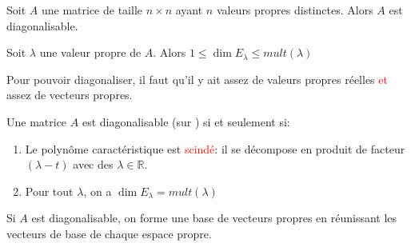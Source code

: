    \begin{theoreme}
        Soit $A$ une matrice de taille $n \times n$ ayant $n$ valeurs propres distinctes. Alors $A$ est diagonalisable.
    \end{theoreme}
    \begin{theoreme}
        Soit $\lambda$ une valeur propre de $A$. Alors $1 \leq \dim E_\lambda \leq mult(\lambda)$
    \end{theoreme}
    Pour pouvoir diagonaliser, il faut qu'il y ait assez de valeurs propres réelles \textcolor{red}{et} assez de vecteurs propres.
    \begin{theoreme}
        Une matrice $A$ est diagonalisable (sur \R) si et seulement si:
        \begin{enumerate}
            \item Le polynôme caractéristique est \textcolor{red}{scindé}: il se décompose en produit de facteur $(\lambda - t)$ avec des $\lambda \in \mathbb{R}$.
            \item Pour tout $\lambda$, on a $\dim E_\lambda = mult(\lambda)$
        \end{enumerate}
        Si $A$ est diagonalisable, on forme une base de vecteurs propres en réunissant les vecteurs de base de chaque espace propre.
    \end{theoreme}
